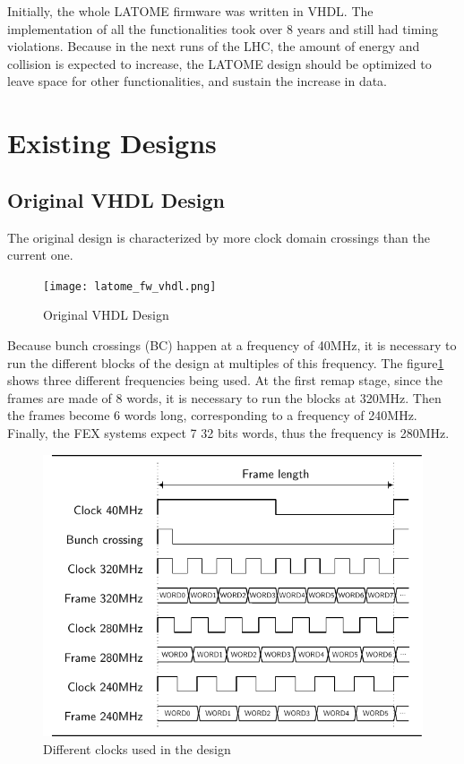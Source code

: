 Initially, the whole LATOME firmware was written in VHDL. The implementation of all the functionalities took over 8 years and still had timing violations. Because in the next runs of the LHC, the amount of energy and collision is expected to increase, the LATOME design should be optimized to leave space for other functionalities, and sustain the increase in data.

\section{Existing Designs}\label{sec:existing-design}

\subsection{Original VHDL Design}\label{sec:original-vhdl-design}
The original design is characterized by more clock domain crossings than the current one.

\begin{figure}
    \centering
    \texttt{[image: latome\_fw\_vhdl.png]}
    \caption{Original VHDL Design}
    \label{fig:original-vhdl-design}
\end{figure}

Because bunch crossings (BC) happen at a frequency of 40MHz, it is necessary to run the different blocks of the design at multiples of this frequency. The figure\ref{fig:original-vhdl-design} shows three different frequencies being used. At the first remap stage, since the frames are made of 8 words, it is necessary to run the blocks at 320MHz. Then the frames become 6 words long, corresponding to a frequency of 240MHz. Finally, the FEX systems expect 7 32 bits words, thus the frequency is 280MHz.

\begin{figure}[htb]
    \centering
    \includegraphics{timings/bc_clocks}
    \caption{Different clocks used in the design}
    \label{fig:bc-clocks}
\end{figure}

